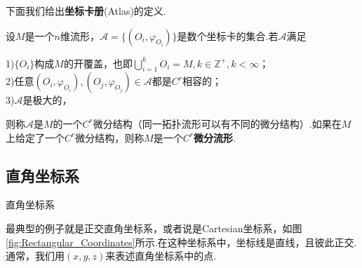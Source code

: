 	下面我们给出\textbf{坐标卡册}(Atlas)的定义.
	\begin{definition}
		设$M$是一个$n$维流形，$\mathcal{A}=\{(O_i,\varphi_{O_i})\}$是数个坐标卡的集合.若$\mathcal{A}$满足

		1)$\{O_i\}$构成$M$的开覆盖，也即$\bigcup\limits_{i=1}^kO_i=M,k\in\mathbb{Z}^+,k<\infty$；\\
		2)任意$(O_i,\varphi_{O_i}),(O_j,\varphi_{O_j})\in\mathcal{A}$都是$C^r$相容的；\\
		3)$\mathcal{A}$是极大的，

		则称$\mathcal{A}$是$M$的一个$C^r$微分结构（同一拓扑流形可以有不同的微分结构）.如果在$M$上给定了一个$C^r$微分结构，则称$M$是一个\textbf{$C^r$微分流形}.
	\end{definition}

	\subsection{直角坐标系}
	\begin{marginfigure}
		\centering
		
		\caption{直角坐标系}\label{fig:Rectangular_Coordinates}
	\end{marginfigure}
	最典型的例子就是正交直角坐标系，或者说是Cartesian坐标系，如图\ref{fig:Rectangular_Coordinates}所示.在这种坐标系中，坐标线是直线，且彼此正交.通常，我们用$(x,y,z)$来表述直角坐标系中的点.
